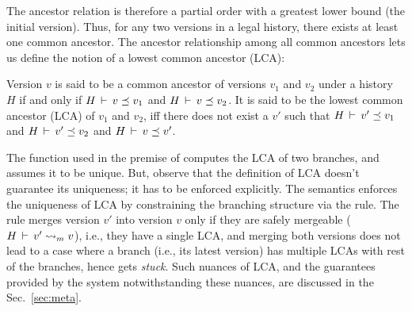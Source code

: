 The ancestor relation is therefore a partial order with a greatest
lower bound (the initial version).  Thus, for any two versions in a
legal history, there exists at least one common ancestor.  The ancestor
relationship among all common ancestors lets us define the notion of a
lowest common ancestor (LCA):

\begin{definition} 
Version $v$ is said to be a common ancestor of versions $v_1$ and
$v_2$ under a history $H$ if and only if $H\,\vdash\,v \preceq v_1$
and $H\,\vdash\,v \preceq v_2$. It is said to be the lowest common
ancestor (LCA) of $v_1$ and $v_2$, iff there does not exist a $v'$
such that $H\,\vdash\,v' \preceq v_1$ and $H\,\vdash\,v' \preceq v_2$
and $H\,\vdash\,v \preceq v'$.
\end{definition}

The function  used in the premise of 
computes the LCA of two branches, and assumes it to be unique.  But,
observe that the definition of LCA doesn't guarantee its uniqueness;
it has to be enforced explicitly.  The semantics enforces the
uniqueness of LCA by constraining the branching structure via the
 rule. The rule merges version $v'$ into
version $v$ only if they are safely mergeable ($H\,\vdash\,v' \rightsquigarrow_m
v$), i.e., they have a single LCA, and merging both versions does not
lead to a case where a branch (i.e., its latest version) has multiple
LCAs with rest of the branches, hence gets \emph{stuck}. Such nuances
of LCA, and the guarantees provided by the system notwithstanding
these nuances, are discussed in the Sec.~\ref{sec:meta}.




